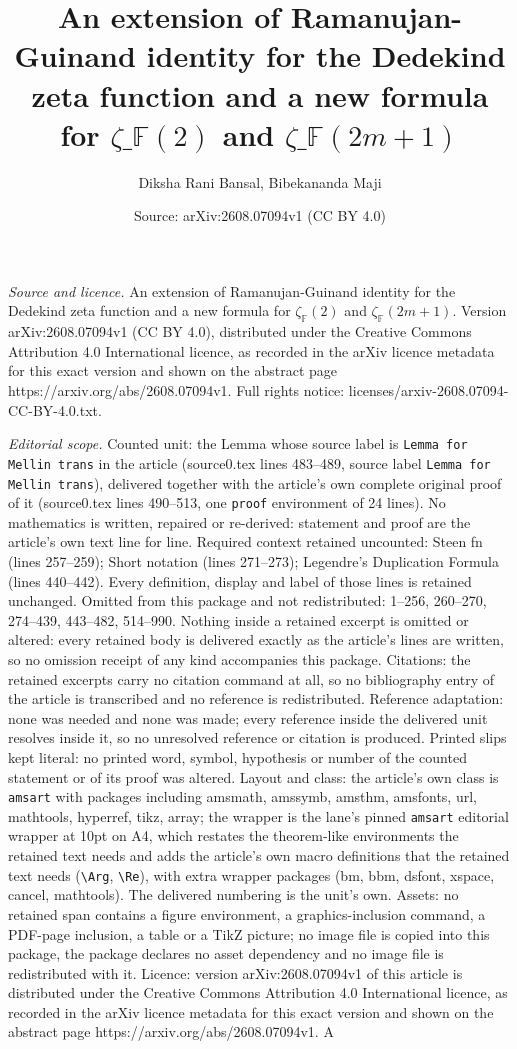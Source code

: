 \documentclass[10pt,a4paper]{amsart}
\title[An extension of Ramanujan-Guinand identity for the Dedekind ]{An extension of Ramanujan-Guinand identity for the Dedekind zeta function and a new formula for $\zeta\_\mathbb{F}(2)$ and $\zeta\_\mathbb{F}(2m+1)$}
\author{Diksha Rani Bansal, Bibekananda Maji}
\date{Source: arXiv:2608.07094v1 (CC BY 4.0)}
\begin{document}
\maketitle

\noindent\emph{Source and licence.} An extension of Ramanujan-Guinand identity for the Dedekind zeta function and a new formula for $\zeta_\mathbb{F}(2)$ and $\zeta_\mathbb{F}(2m+1)$. Version arXiv:2608.07094v1 (CC BY 4.0), distributed under the Creative Commons Attribution 4.0 International licence, as recorded in the arXiv licence metadata for this exact version and shown on the abstract page https://arxiv.org/abs/2608.07094v1. Full rights notice: licenses/arxiv-2608.07094-CC-BY-4.0.txt.\par\smallskip

\noindent\textit{Editorial scope.} Counted unit: the Lemma whose source label is \texttt{Lemma for Mellin trans} in the article (source0.tex lines 483--489, source label \texttt{Lemma for Mellin trans}), delivered together with the article's own complete original proof of it (source0.tex lines 490--513, one \texttt{proof} environment of 24 lines). No mathematics is written, repaired or re-derived: statement and proof are the article's own text line for line. Required context retained uncounted: Steen fn (lines 257--259); Short notation (lines 271--273); Legendre's Duplication Formula (lines 440--442). Every definition, display and label of those lines is retained unchanged. Omitted from this package and not redistributed: 1--256, 260--270, 274--439, 443--482, 514--990. Nothing inside a retained excerpt is omitted or altered: every retained body is delivered exactly as the article's lines are written, so no omission receipt of any kind accompanies this package. Citations: the retained excerpts carry no citation command at all, so no bibliography entry of the article is transcribed and no reference is redistributed. Reference adaptation: none was needed and none was made; every reference inside the delivered unit resolves inside it, so no unresolved reference or citation is produced. Printed slips kept literal: no printed word, symbol, hypothesis or number of the counted statement or of its proof was altered. Layout and class: the article's own class is \texttt{amsart} with packages including amsmath, amssymb, amsthm, amsfonts, url, mathtools, hyperref, tikz, array; the wrapper is the lane's pinned \texttt{amsart} editorial wrapper at 10pt on A4, which restates the theorem-like environments the retained text needs and adds the article's own macro definitions that the retained text needs (\texttt{\textbackslash Arg}, \texttt{\textbackslash Re}), with extra wrapper packages (bm, bbm, dsfont, xspace, cancel, mathtools). The delivered numbering is the unit's own. Assets: no retained span contains a figure environment, a graphics-inclusion command, a PDF-page inclusion, a table or a TikZ picture; no image file is copied into this package, the package declares no asset dependency and no image file is redistributed with it. Licence: version arXiv:2608.07094v1 of this article is distributed under the Creative Commons Attribution 4.0 International licence, as recorded in the arXiv licence metadata for this exact version and shown on the abstract page https://arxiv.org/abs/2608.07094v1. A 
\end{document}

